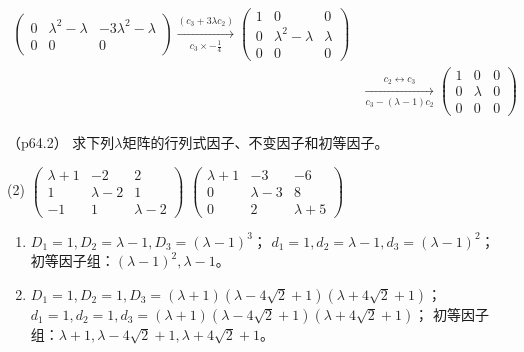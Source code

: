 \documentclass[12pt, a4paper, oneside, UTF8]{ctexbook}
\begin{document}
\begin{solution}
\begin{align*}
\begin{pmatrix}
            0 & \lambda^2-\lambda & -3\lambda^2-\lambda \\
            0 & 0& 0 
        \end{pmatrix}
        \xrightarrow[c_3 \times -\frac{1}{4}]{(c_3+3\lambda c_2)}
        \begin{pmatrix}
            1 & 0 &0 \\
            0 & \lambda^2-\lambda & \lambda \\
            0 & 0& 0 
        \end{pmatrix} \\
        &\xrightarrow[c_3-(\lambda-1) c_2 ]{c_2 \leftrightarrow c_3}
        \begin{pmatrix}
            1 & 0 &0 \\
            0 & \lambda & 0\\
            0 & 0& 0 
        \end{pmatrix}
    \end{align*}
\end{solution}

\begin{question}（p64.2）
    求下列$\lambda$矩阵的行列式因子、不变因子和初等因子。
    \begin{tasks}[label=(\arabic*)](2)
        \task $\begin{pmatrix}
            \lambda+1 & -2 & 2 \\
            1 & \lambda-2 & 1\\
            -1 & 1& \lambda-2
        \end{pmatrix}$
        \task $\begin{pmatrix}
            \lambda+1 & -3 & -6 \\
            0 & \lambda-3 & 8\\
            0 & 2& \lambda+5
        \end{pmatrix}$
    \end{tasks}
\end{question}

\begin{solution}
    \begin{enumerate}[label=(\arabic*)]
        \item 
        $D_1=1,D_2=\lambda-1,D_3=(\lambda-1)^3$；
        $d_1=1,d_2=\lambda-1,d_3=(\lambda-1)^2$；
        初等因子组：$(\lambda-1)^2,\lambda-1$。
        \item $D_1=1,D_2=1,D_3=(\lambda+1)(\lambda-4\sqrt{2}+1)(\lambda+4\sqrt{2}+1)$；
        $d_1=1,d_2=1,d_3=(\lambda+1)(\lambda-4\sqrt{2}+1)(\lambda+4\sqrt{2}+1)$；
        初等因子组：$\lambda+1,\lambda-4\sqrt{2}+1,\lambda+4\sqrt{2}+1$。
    \end{enumerate}
\end{solution}
\end{document}
